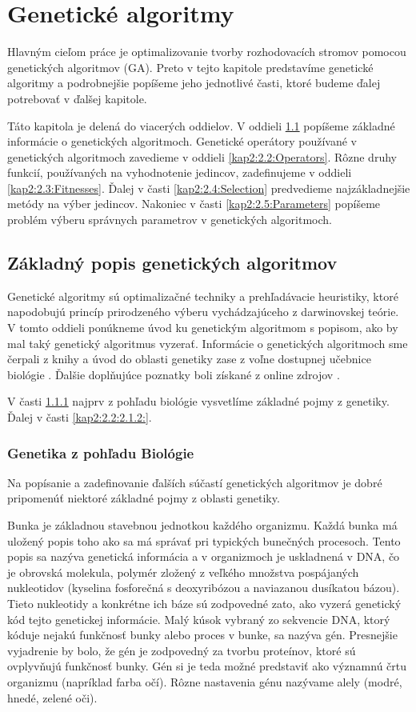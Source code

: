 \chapter{Genetické algoritmy}
Hlavným cieľom práce je optimalizovanie tvorby rozhodovacích stromov pomocou genetických algoritmov (GA). Preto 
v tejto kapitole predstavíme genetické algoritmy a podrobnejšie popíšeme jeho jednotlivé časti, ktoré budeme ďalej potrebovať v ďalšej kapitole.

Táto kapitola je delená do viacerých oddielov. V oddieli \ref{kap2:2.1:Info} popíšeme základné informácie o genetických algoritmoch. Genetické operátory používané v genetických algoritmoch zavedieme v oddieli \ref{kap2:2.2:Operators}. Rôzne druhy funkcií, používaných na vyhodnotenie jedincov, zadefinujeme v oddieli \ref{kap2:2.3:Fitnesses}. Ďalej v časti \ref{kap2:2.4:Selection} predvedieme najzákladnejšie metódy na výber jedincov. Nakoniec v časti \ref{kap2:2.5:Parameters} popíšeme problém výberu správnych parametrov v genetických algoritmoch.

\section{Základný popis genetických algoritmov}\label{kap2:2.1:Info}
Genetické algoritmy sú optimalizačné techniky a prehľadávacie heuristiky, ktoré napodobujú princíp prirodzeného výberu vychádzajúceho z darwinovskej teórie. V tomto oddieli ponúkneme úvod ku genetickým algoritmom s popisom, ako by mal taký genetický algoritmus vyzerať. Informácie o genetických algoritmoch sme čerpali z knihy \cite{kap2-evolution} a úvod do oblasti genetiky zase z voľne dostupnej učebnice biológie \cite{online-biology}. Ďalšie doplňujúce poznatky boli získané z online zdrojov \cite{wiki-evolution,wiki-genetics}.

V časti \ref{kap2:2.1:2.1.1:Genetics} najprv z pohľadu biológie vysvetlíme základné pojmy z genetiky. Ďalej v časti \ref{kap2:2.2:2.1.2:}.

\subsection{Genetika z pohľadu Biológie}\label{kap2:2.1:2.1.1:Genetics}
Na popísanie a zadefinovanie ďalších súčastí genetických algoritmov je dobré pripomenúť niektoré základné pojmy z oblasti genetiky. 

Bunka je základnou stavebnou jednotkou každého organizmu. Každá bunka má uložený popis toho ako sa má správať pri typických bunečných procesoch. Tento popis sa nazýva genetická informácia a v organizmoch je uskladnená v DNA, čo je obrovská molekula, polymér zložený z veľkého množstva pospájaných nukleotidov (kyselina fosforečná s deoxyribózou a naviazanou dusíkatou bázou). Tieto nukleotidy a konkrétne ich báze sú zodpovedné zato, ako vyzerá genetický kód tejto genetickej informácie. Malý kúsok vybraný zo sekvencie DNA, ktorý kóduje nejakú funkčnosť bunky alebo proces v bunke, sa nazýva gén. Presnejšie vyjadrenie by bolo, že gén je zodpovedný za tvorbu proteínov, ktoré sú ovplyvňujú funkčnosť bunky. Gén si je teda možné predstaviť ako významnú črtu organizmu (napríklad farba očí). Rôzne nastavenia génu nazývame alely (modré, hnedé, zelené oči).

